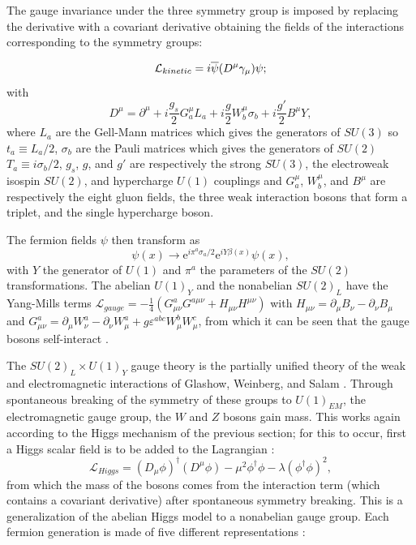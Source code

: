 The gauge invariance under the three symmetry group is imposed by replacing the derivative with a covariant derivative obtaining the fields of the interactions corresponding to the symmetry groups:

\begin{equation}
\mathcal L_{kinetic} =  i\overline{\psi}(D^\mu\gamma_\mu)\psi \\;
\label{eqn:newSMLkinetic}
\end{equation}
with
\begin{equation}
D^\mu = \partial^\mu + i\frac{g_s}{2}G^\mu_aL_a + i\frac{g}{2}W^\mu_b\sigma_b+i\frac{g'}{2}B^\mu Y,
\label{eqn:SMcovariant}
\end{equation}
where $L_a$ are the Gell-Mann matrices which gives the generators of $SU(3)$ so $t_a \equiv L_a/2$, $\sigma_b$ are the Pauli matrices which gives the generators of $SU(2)$ $T_a \equiv i\sigma_b/2$, $g_s$, $g$, and $g'$ are respectively the strong $SU(3)$, the electroweak isospin $SU(2)$, and hypercharge $U(1)$ couplings and $G^\mu_a$, $W^\mu_b$, and $B^\mu$ are respectively the eight gluon fields, the three weak interaction bosons that form a triplet, and the single hypercharge boson.

The fermion fields $\psi$ then transform as 
\begin{equation}
\psi(x) \to \mathrm{e}^{i\pi^a\sigma_a/2}\mathrm{e}^{iY\beta(x)}\psi(x),
\label{eqn:phitransformsagain}
\end{equation}
with $Y$ the generator of $U(1)$ and $\pi^a$ the parameters of the $SU(2)$ transformations. The abelian $U(1)_Y$ and the nonabelian $SU(2)_L$ have the Yang-Mills terms $\mathcal{L}_{gauge} = -\frac{1}{4}(G^a_{\mu\nu}G^{a\mu\nu} + H_{\mu\nu}H^{\mu\nu})$ with $H_{\mu\nu} = \partial_\mu B_{\nu} -\partial_\nu B_\mu$ and $G^a_{\mu\nu}= \partial_\mu W^a_\nu -\partial_\nu W^a_\mu + g\varepsilon^{abc}W^b_\mu W^c_\mu$, from which it can be seen that the gauge bosons self-interact \cite{roubillard2005th}.

The $SU(2)_L \times U(1)_Y$ gauge theory is the partially unified theory of the weak and electromagnetic interactions of Glashow, Weinberg, and Salam \cite{peskin1995introduction}. Through spontaneous breaking of the symmetry of these groups to $U(1)_{EM}$, the electromagnetic gauge group, the $W$ and $Z$ bosons gain mass. This works again according to the Higgs mechanism of the previous section; for this to occur, first a Higgs scalar field is to be added to the Lagrangian \cite{quigg1983gauge}:
\begin{equation}
\mathcal L_{Higgs} = (D_\mu\phi)^\dag(D^\mu\phi) - \mu^2\phi^\dag\phi - \lambda(\phi^\dag\phi)^2,
\label{eqn:SMLHiggs}
\end{equation}
from which the mass of the bosons comes from the interaction term (which contains a covariant derivative) after spontaneous symmetry breaking. This is a generalization of the abelian Higgs model to a nonabelian gauge group. Each fermion generation is made of five different representations \cite{peskin1995introduction}:

